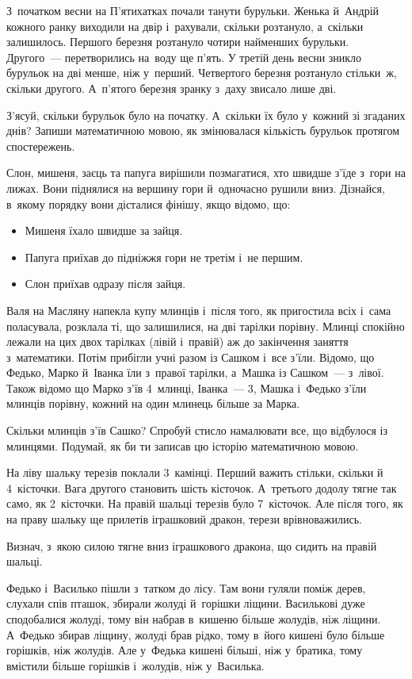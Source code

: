 \problem
З~початком весни на П'ятихатках почали танути бурульки.
Женька й~Андрій кожного ранку виходили на двір і~рахували, скільки розтануло,
а~скільки залишилось.
Першого березня розтануло чотири найменших бурульки.
Другого~--- перетворились на~воду ще п'ять.
У третій день весни зникло бурульок на дві менше, ніж у~перший.
Четвертого березня розтануло стільки~ж, скільки другого.
А~п'ятого березня зранку з~даху звисало лише дві.

З'ясуй, скільки бурульок було на початку.
А~скільки їх було у~кожний зі згаданих днів?
Запиши математичною мовою, як змінювалася кількість бурульок
протягом спостережень.


\problem
Слон, мишеня, заєць та папуга вирішили позмагатися, хто швидше з'їде
з~гори на лижах. Вони піднялися на вершину гори й~одночасно рушили вниз.
Дізнайся, в~якому порядку вони дісталися фінішу, якщо відомо, що:
\begin{itemize}
  \item Мишеня їхало швидше за зайця.
  \item Папуга приїхав до підніжжя гори не третім і~не першим.
  \item Слон приїхав одразу після зайця.
\end{itemize}


\problem
Валя на Масляну напекла купу млинців і~після того, як пригостила всіх
і~сама поласувала, розклала ті, що залишилися, на дві тарілки порівну.
Млинці спокійно лежали на цих двох тарілках (лівій і~правій)
аж до закінчення заняття з~математики.
Потім прибігли учні разом із Сашком і~все з'їли.
Відомо, що Федько, Марко й~Іванка їли з~правої тарілки,
а~Машка із Сашком~--- з~лівої.
Також відомо що Марко з'їв 4~млинці, Іванка~--- 3,
Машка і~Федько з'їли млинців порівну, кожний на один млинець більше за Марка.

Скільки млинців з'їв Сашко?
Спробуй стисло намалювати все, що відбулося із млинцями.
Подумай, як би ти записав цю історію математичною мовою.


\problem
На ліву шальку терезів поклали 3~камінці.
Перший важить стільки, скільки й 4~кісточки.
Вага другого становить шість кісточок.
А~третього додолу тягне так само, як 2~кісточки.
На правій шальці терезів було 7~кісточок.
Але після того, як на праву шальку ще прилетів іграшковий дракон,
терези врівноважились.

Визнач, з~якою силою тягне вниз іграшкового дракона,
що сидить на правій шальці.


\problem
Федько і~Василько пішли з~татком до лісу.
Там вони гуляли поміж дерев, слухали спів пташок,
збирали жолуді й~горішки ліщини.
Василькові дуже сподобалися жолуді, тому він набрав в~кишеню більше
жолудів, ніж ліщини. А~Федько збирав ліщину, жолуді брав рідко,
тому в~його кишені було більше горішків, ніж жолудів.
Але у~Федька кишені більші, ніж у~братика, тому вмістили
більше горішків і~жолудів, ніж у~Василька.

